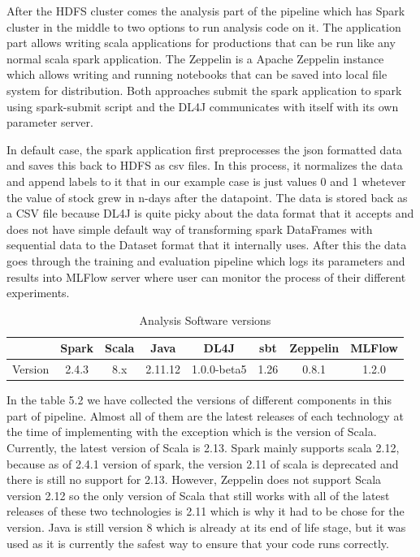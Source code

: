 After the HDFS cluster comes the analysis part of the pipeline which has Spark cluster in the middle to two options to run analysis code on it.
The application part allows writing scala applications for productions that can be run like any normal scala spark application.
The Zeppelin is a Apache Zeppelin instance which allows writing and running notebooks that can be saved into local file system for distribution.
Both approaches submit the spark application to spark using spark-submit script and the DL4J communicates with itself with its own parameter server.

In default case, the spark application first preprocesses the json formatted data and saves this back to HDFS as csv files.
In this process, it normalizes the data and append labels to it that in our example case is just values 0 and 1 whetever the value of stock grew in n-days after the datapoint.
The data is stored back as a CSV file because DL4J is quite picky about the data format that it accepts and does not have simple default way of transforming spark DataFrames with sequential data to the Dataset format that it internally uses.
After this the data goes through the training and evaluation pipeline which logs its parameters and results into MLFlow server where user can monitor the process of their different experiments.

\begin{table}[! htbp]\centering
    \caption{Analysis Software versions}
    \begin{threeparttable}
        \begin{tabular}{|c|c|c|c|c|c|c|c|} 
        \hline
        & Spark & Scala & Java & DL4J & sbt & Zeppelin & MLFlow \\ \hline
        Version & 2.4.3 & 8.x & 2.11.12 & 1.0.0-beta5 & 1.26 & 0.8.1 & 1.2.0\\
        \hline
        \end{tabular}
    \end{threeparttable}
\end{table}

In the table 5.2 we have collected the versions of different components in this part of pipeline.
Almost all of them are the latest releases of each technology at the time of implementing with the exception which is the version of Scala.
Currently, the latest version of Scala is 2.13.
Spark mainly supports scala 2.12, because as of 2.4.1 version of spark, the version 2.11 of scala is deprecated and there is still no support for 2.13.
However, Zeppelin does not support Scala version 2.12 so the only version of Scala that still works with all of the latest releases of these two technologies is 2.11 which is why it had to be chose for the version.
Java is still version 8 which is already at its end of life stage, but it was used as it is currently the safest way to ensure that your code runs correctly.

